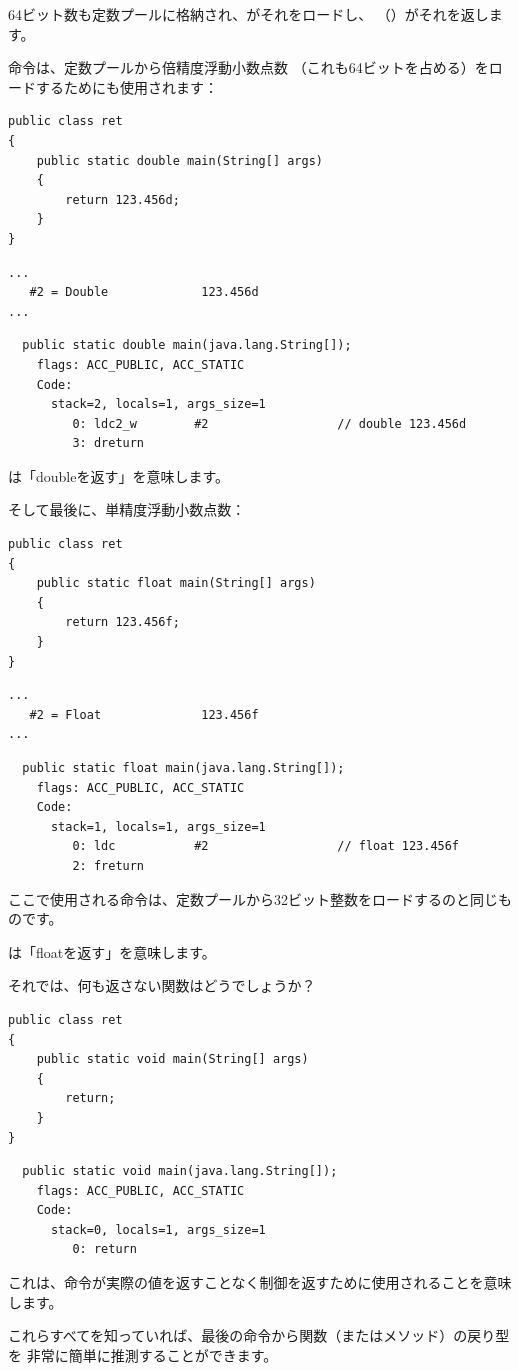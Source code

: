 64ビット数も定数プールに格納され、がそれをロードし、
（）がそれを返します。

命令は、定数プールから倍精度浮動小数点数
（これも64ビットを占める）をロードするためにも使用されます：

\begin{lstlisting}[style=customjava]
public class ret
{
	public static double main(String[] args)
	{
		return 123.456d;
	}
}
\end{lstlisting}

\begin{lstlisting}[caption=定数プール]
...
   #2 = Double             123.456d
...
\end{lstlisting}

\begin{lstlisting}
  public static double main(java.lang.String[]);
    flags: ACC_PUBLIC, ACC_STATIC
    Code:
      stack=2, locals=1, args_size=1
         0: ldc2_w        #2                  // double 123.456d
         3: dreturn       
\end{lstlisting}

は「doubleを返す」を意味します。

そして最後に、単精度浮動小数点数：

\begin{lstlisting}[style=customjava]
public class ret
{
	public static float main(String[] args)
	{
		return 123.456f;
	}
}
\end{lstlisting}

\begin{lstlisting}[caption=定数プール]
...
   #2 = Float              123.456f
...
\end{lstlisting}

\begin{lstlisting}
  public static float main(java.lang.String[]);
    flags: ACC_PUBLIC, ACC_STATIC
    Code:
      stack=1, locals=1, args_size=1
         0: ldc           #2                  // float 123.456f
         2: freturn       
\end{lstlisting}

ここで使用される命令は、定数プールから32ビット整数をロードするのと同じものです。

は「floatを返す」を意味します。

それでは、何も返さない関数はどうでしょうか？

\begin{lstlisting}[style=customjava]
public class ret
{
	public static void main(String[] args) 
	{
		return;
	}
}
\end{lstlisting}

\begin{lstlisting}
  public static void main(java.lang.String[]);
    flags: ACC_PUBLIC, ACC_STATIC
    Code:
      stack=0, locals=1, args_size=1
         0: return        
\end{lstlisting}

これは、命令が実際の値を返すことなく制御を返すために使用されることを意味します。

これらすべてを知っていれば、最後の命令から関数（またはメソッド）の戻り型を
非常に簡単に推測することができます。